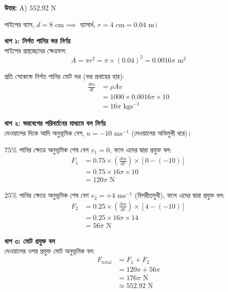 \documentclass[12pt, a4paper]{article}
\begin{document}
\vspace{0.5em}
\begin{tcolorbox}[answerbox]
    \textbf{\color{success} উত্তর:} A)  $552.92\text{ N}$
\end{tcolorbox}
\vspace{1em}

\begin{tcolorbox}[solutionbox={সমাধান (Solution)}]
    \noindent
    পাইপের ব্যাস, $d = 8\text{ cm} \implies$ ব্যাসার্ধ, $r = 4\text{ cm} = 0.04\text{ m}$।
    
    \vspace{0.5em}
    \noindent\textbf{ধাপ ১: নির্গত পানির ভর নির্ণয়} \\
    পাইপের প্রস্থচ্ছেদের ক্ষেত্রফল:
    \[ A = \pi r^2 = \pi \times (0.04)^2 = 0.0016\pi\text{ m}^2 \]
    
    প্রতি সেকেন্ডে নির্গত পানির মোট ভর (ভর প্রবাহের হার):
    \begin{align*}
        \frac{dm}{dt} &= \rho A v \\
        &= 1000 \times 0.0016\pi \times 10 \\
        &= 16\pi\text{ kgs}^{-1}
    \end{align*}
    
    \vspace{0.5em}
    \noindent\textbf{ধাপ ২: ভরবেগের পরিবর্তনের মাধ্যমে বল নির্ণয়} \\
    দেওয়ালের দিকে আদি অনুভূমিক বেগ, $u = -10\text{ ms}^{-1}$ (দেওয়ালের অভিমুখী ধরে)।
    
    $75\%$ পানির ক্ষেত্রে অনুভূমিক শেষ বেগ $v_1 = 0$, ফলে এদের দ্বারা প্রযুক্ত বল:
    \begin{align*}
        F_1 &= 0.75 \times \left(\frac{dm}{dt}\right) \times [0 - (-10)] \\
        &= 0.75 \times 16\pi \times 10 \\
        &= 120\pi\text{ N}
    \end{align*}
    
    $25\%$ পানির ক্ষেত্রে অনুভূমিক শেষ বেগ $v_2 = +4\text{ ms}^{-1}$ (বিপরীতমুখী), ফলে এদের দ্বারা প্রযুক্ত বল:
    \begin{align*}
        F_2 &= 0.25 \times \left(\frac{dm}{dt}\right) \times [4 - (-10)] \\
        &= 0.25 \times 16\pi \times 14 \\
        &= 56\pi\text{ N}
    \end{align*}
    
    \vspace{0.5em}
    \noindent\textbf{ধাপ ৩: মোট প্রযুক্ত বল} \\
    দেওয়ালের ওপর প্রযুক্ত মোট অনুভূমিক বল:
    \begin{align*}
        F_{\text{total}} &= F_1 + F_2 \\
        &= 120\pi + 56\pi \\
        &= 176\pi\text{ N} \\
        &\approx \mathbf{552.92}\text{ N}
    \end{align*}
\end{tcolorbox}
\end{document}
